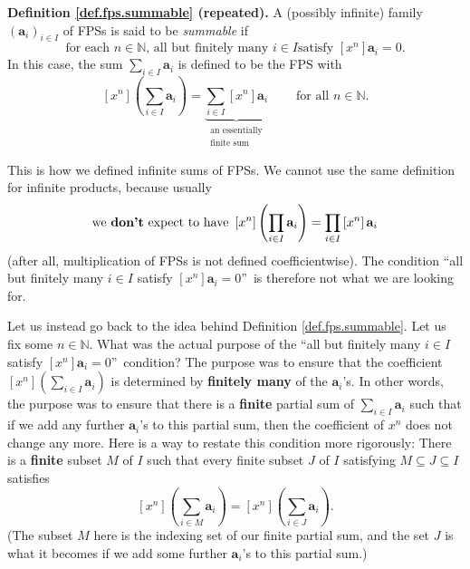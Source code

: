 \begin{statement}
\textbf{Definition \ref{def.fps.summable} (repeated).} A (possibly infinite)
family $\left(  \mathbf{a}_{i}\right)  _{i\in I}$ of FPSs is said to be
\emph{summable} if%
\[
\text{for each }n\in\mathbb{N}\text{, all but finitely many }i\in I\text{
satisfy }\left[  x^{n}\right]  \mathbf{a}_{i}=0.
\]
In this case, the sum $\sum_{i\in I}\mathbf{a}_{i}$ is defined to be the FPS
with%
\[
\left[  x^{n}\right]  \left(  \sum_{i\in I}\mathbf{a}_{i}\right)
=\underbrace{\sum_{i\in I}\left[  x^{n}\right]  \mathbf{a}_{i}}%
_{\substack{\text{an essentially}\\\text{finite sum}}%
}\ \ \ \ \ \ \ \ \ \ \text{for all }n\in\mathbb{N}\text{.}%
\]

\end{statement}

This is how we defined infinite sums of FPSs. We cannot use the same
definition for infinite products, because usually%
\[
\text{we \textbf{don't} expect to have }\left[  x^{n}\right]  \left(
\prod_{i\in I}\mathbf{a}_{i}\right)  =\prod_{i\in I}\left[  x^{n}\right]
\mathbf{a}_{i}%
\]
(after all, multiplication of FPSs is not defined coefficientwise). The
condition \textquotedblleft all but finitely many $i\in I$ satisfy $\left[
x^{n}\right]  \mathbf{a}_{i}=0$\textquotedblright\ is therefore not what we
are looking for.

Let us instead go back to the idea behind Definition \ref{def.fps.summable}.
Let us fix some $n\in\mathbb{N}$. What was the actual purpose of the
\textquotedblleft all but finitely many $i\in I$ satisfy $\left[
x^{n}\right]  \mathbf{a}_{i}=0$\textquotedblright\ condition? The purpose was
to ensure that the coefficient $\left[  x^{n}\right]  \left(  \sum_{i\in
I}\mathbf{a}_{i}\right)  $ is determined by \textbf{finitely many} of the
$\mathbf{a}_{i}$'s. In other words, the purpose was to ensure that there is a
\textbf{finite} partial sum of $\sum_{i\in I}\mathbf{a}_{i}$ such that if we
add any further $\mathbf{a}_{i}$'s to this partial sum, then the coefficient
of $x^{n}$ does not change any more. Here is a way to restate this condition
more rigorously: There is a \textbf{finite} subset $M$ of $I$ such that every
finite subset $J$ of $I$ satisfying $M\subseteq J\subseteq I$ satisfies%
\[
\left[  x^{n}\right]  \left(  \sum_{i\in M}\mathbf{a}_{i}\right)  =\left[
x^{n}\right]  \left(  \sum_{i\in J}\mathbf{a}_{i}\right)  .
\]
(The subset $M$ here is the indexing set of our finite partial sum, and the
set $J$ is what it becomes if we add some further $\mathbf{a}_{i}$'s to this
partial sum.)

